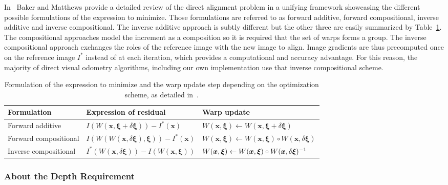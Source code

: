 In~\cite{baker2004lucas} Baker and Matthews provide a detailed review of the direct
alignment problem in a unifying framework showcasing the different possible formulations
of the expression to minimize.
Those formulations are referred to as forward additive, forward compositional,
inverse additive and inverse compositional.
The inverse additive approach is subtly different but the other three are
easily summarized by Table~\ref{tab:image-alignment-method}.
The compositional approaches model the increment as a composition
so it is required that the set of warps forms a group.
The inverse compositional approach exchanges the roles of the reference image
with the new image to align.
Image gradients are thus precomputed once on the reference image $I^{*}$
instead of at each iteration,
which provides a computational and accuracy advantage.
For this reason, the majority of direct visual odometry algorithms,
including our own implementation use that inverse compositional scheme.


\begin{table}[ht]
\centering
\begin{tabular}{lll}
Formulation
	& Expression of residual
    & Warp update\\
    \midrule
Forward additive
	& $I(W(\bm{x}, \bm{\xi} + \delta \bm{\xi})) - I^{*}(\bm{x})$
	& $W(\bm{x}, \bm{\xi}) \leftarrow W(\bm{x}, \bm{\xi} + \delta \bm{\xi})$\\
Forward compositional
	& $I(W(W(\bm{x}, \delta \bm{\xi}), \bm{\xi})) - I^{*}(\bm{x})$
	& $W(\bm{x}, \bm{\xi}) \leftarrow W(\bm{x}, \bm{\xi}) \circ W(\bm{x}, \delta \bm{\xi})$\\
Inverse compositional
	& $I^{*}(W(\bm{x}, \delta \bm{\xi})) - I(W(\bm{x}, \bm{\xi}))$
	& $W(\bm{x}, \bm{\xi}) \leftarrow W(\bm{x}, \bm{\xi}) \circ W(\bm{x}, \delta \bm{\xi})^{-1}$\\
\end{tabular}

\caption{Formulation of the expression to minimize and the warp update step
	depending on the optimization scheme, as detailed in~\cite{baker2004lucas}.}%
\label{tab:image-alignment-method}
\end{table}

\subsubsection{About the Depth Requirement}%
\label{ssub:depth_requirement}

